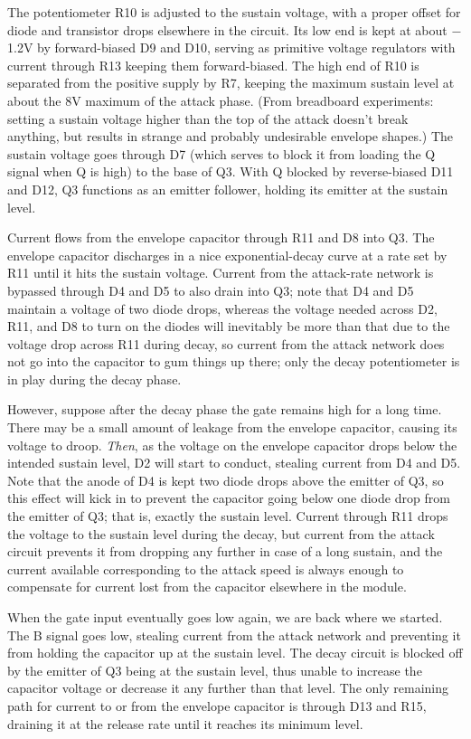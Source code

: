 The potentiometer R10 is adjusted to the sustain voltage, with a proper
offset for diode and transistor drops elsewhere in the circuit.  Its low end
is kept at about $-$1.2V by forward-biased D9 and D10, serving as primitive
voltage regulators with current through R13 keeping them forward-biased. 
The high end of R10 is separated from the positive supply by R7, keeping the
maximum sustain level at about the 8V maximum of the attack phase.  (From
breadboard experiments: setting a sustain voltage higher than the top of the
attack doesn't break anything, but results in strange and probably
undesirable envelope shapes.) The sustain voltage goes through D7 (which
serves to block it from loading the Q signal when Q is high) to the base of
Q3.  With Q blocked by reverse-biased D11 and D12, Q3 functions as an
emitter follower, holding its emitter at the sustain level.

Current flows from the envelope capacitor through R11 and D8 into Q3.  The
envelope capacitor discharges in a nice exponential-decay curve at a rate
set by R11 until it hits the sustain voltage.  Current from the attack-rate
network is bypassed through D4 and D5 to also drain into Q3; note that D4
and D5 maintain a voltage of two diode drops, whereas the voltage needed
across D2, R11, and D8 to turn on the diodes will inevitably be more than
that due to the voltage drop across R11 during decay, so current from the
attack network does not go into the capacitor to gum things up there; only
the decay potentiometer is in play during the decay phase.

However, suppose after the decay phase the
gate remains high for a long time.  There may be a small amount of leakage
from the envelope capacitor, causing its voltage to droop.  \emph{Then}, as
the voltage on the envelope capacitor drops below the intended sustain
level, D2 will start to conduct, stealing current from D4 and D5.  Note that
the anode of D4 is kept two diode drops above the emitter of Q3, so this
effect will kick in to prevent the capacitor going below one diode drop from
the emitter of Q3; that is, exactly the sustain level.  Current through R11
drops the voltage to the sustain level during the decay, but current from
the attack circuit prevents it from dropping any further in case of a long
sustain, and the current available corresponding to the attack speed is
always enough to compensate for current lost from the capacitor elsewhere in
the module.

When the gate input eventually goes low again, we are back where we started. 
The B signal goes low, stealing current from the attack network and
preventing it from holding the capacitor up at the sustain level.  The decay
circuit is blocked off by the emitter of Q3 being at the sustain level,
thus unable to increase the capacitor voltage or decrease it any further
than that level.  The only remaining path for current to or from the
envelope capacitor is through D13 and R15, draining it at the release rate
until it reaches its minimum level.


